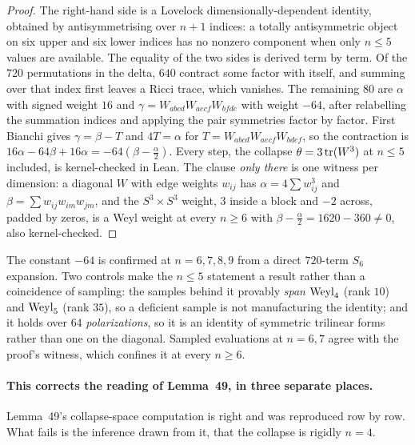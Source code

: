 \begin{proof}
The right-hand side is a Lovelock dimensionally-dependent identity, obtained by antisymmetrising over $n+1$ indices: a totally antisymmetric object on six upper and six lower indices has no nonzero component when only $n\le5$ values are available. The equality of the two sides is derived term by term. Of the $720$ permutations in the delta, $640$ contract some factor with itself, and summing over that index first leaves a Ricci trace, which vanishes. The remaining $80$ are $\alpha$ with signed weight $16$ and $\gamma=W_{abcd}W_{aecf}W_{bfde}$ with weight $-64$, after relabelling the summation indices and applying the pair symmetries factor by factor. First Bianchi gives $\gamma=\beta-T$ and $4T=\alpha$ for $T=W_{abcd}W_{aecf}W_{bdef}$, so the contraction is $16\alpha-64\beta+16\alpha=-64(\beta-\tfrac\alpha2)$. Every step, the collapse $\theta=3\operatorname{tr}(W^3)$ at $n\le5$ included, is kernel-checked in Lean. The clause \emph{only there} is one witness per dimension: a diagonal $W$ with edge weights $w_{ij}$ has $\alpha=4\sum w_{ij}^3$ and $\beta=\sum w_{ij}w_{im}w_{jm}$, and the $S^3\times S^3$ weight, $3$ inside a block and $-2$ across, padded by zeros, is a Weyl weight at every $n\ge6$ with $\beta-\tfrac\alpha2=1620-360\ne0$, also kernel-checked.
\end{proof}

\begin{certificate}
The constant $-64$ is confirmed at $n=6,7,8,9$ from a direct $720$-term $S_6$ expansion. Two controls make the $n\le5$ statement a result rather than a coincidence of sampling: the samples behind it provably \emph{span} $\mathrm{Weyl}_4$ (rank $10$) and $\mathrm{Weyl}_5$ (rank $35$), so a deficient sample is not manufacturing the identity; and it holds over $64$ \emph{polarizations}, so it is an identity of symmetric trilinear forms rather than one on the diagonal. Sampled evaluations at $n=6,7$ agree with the proof's witness, which confines it at every $n\ge6$.
\end{certificate}

\paragraph{This corrects the reading of Lemma~49, in three separate places.} Lemma~49's collapse-space computation is right and was reproduced row by row. What fails is the inference drawn from it, that the collapse is rigidly $n=4$.

